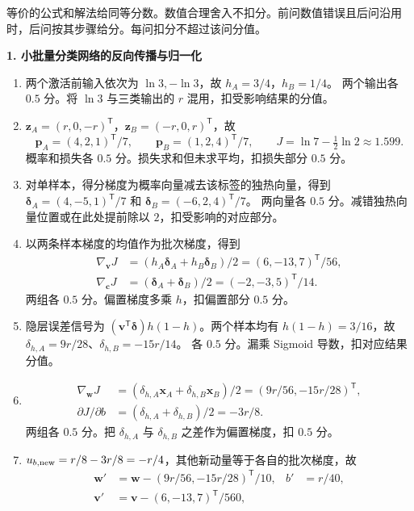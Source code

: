 
\noindent 等价的公式和解法给同等分数。数值合理舍入不扣分。前问数值错误且后问沿用时，后问按其步骤给分。每问扣分不超过该问分值。

\noindent\textbf{1. 小批量分类网络的反向传播与归一化}

\begin{enumerate}[label=(\arabic*)]
\item 两个激活前输入依次为 $\ln 3,-\ln 3$，故 $h_A=3/4$，$h_B=1/4$。
两个输出各 $0.5$ 分。将 $\ln 3$ 与三类输出的 $r$ 混用，扣受影响结果的分值。
\item $\bm{z}_A=(r,0,-r)^{\mathsf T}$，$\bm{z}_B=(-r,0,r)^{\mathsf T}$，故
\[
\bm{p}_A=(4,2,1)^{\mathsf T}/7,\qquad \bm{p}_B=(1,2,4)^{\mathsf T}/7,
\qquad J=\ln 7-\tfrac12\ln 2\approx1.599.
\]
概率和损失各 $0.5$ 分。损失求和但未求平均，扣损失部分 $0.5$ 分。
\item 对单样本，得分梯度为概率向量减去该标签的独热向量，得到
$\bm{\delta}_A=(4,-5,1)^{\mathsf T}/7$ 和 $\bm{\delta}_B=(-6,2,4)^{\mathsf T}/7$。
两向量各 $0.5$ 分。减错独热向量位置或在此处提前除以 $2$，扣受影响的对应部分。
\item 以两条样本梯度的均值作为批次梯度，得到
\begin{align*}
\nabla_{\bm{v}}J&=(h_A\bm{\delta}_A+h_B\bm{\delta}_B)/2
=(6,-13,7)^{\mathsf T}/56,\\
\nabla_{\bm{c}}J&=(\bm{\delta}_A+\bm{\delta}_B)/2=(-2,-3,5)^{\mathsf T}/14.
\end{align*}
两组各 $0.5$ 分。偏置梯度多乘 $h$，扣偏置部分 $0.5$ 分。
\item 隐层误差信号为 $(\bm{v}^{\mathsf T}\bm{\delta})h(1-h)$。两个样本均有 $h(1-h)=3/16$，故 $\delta_{h,A}=9r/28$、$\delta_{h,B}=-15r/14$。
各 $0.5$ 分。漏乘 Sigmoid 导数，扣对应结果分值。
\item
\begin{align*}
\nabla_{\bm{w}}J&=(\delta_{h,A}\bm{x}_A+\delta_{h,B}\bm{x}_B)/2
=(9r/56,-15r/28)^{\mathsf T},\\
\partial J/\partial b&=(\delta_{h,A}+\delta_{h,B})/2=-3r/8.
\end{align*}
两组各 $0.5$ 分。把 $\delta_{h,A}$ 与 $\delta_{h,B}$ 之差作为偏置梯度，扣 $0.5$ 分。
\item $u_{b,\rm new}=r/8-3r/8=-r/4$，其他新动量等于各自的批次梯度，故
\begin{align*}
\bm{w}'&=\bm{w}-(9r/56,-15r/28)^{\mathsf T}/10,& b'&=r/40,\\
\bm{v}'&=\bm{v}-(6,-13,7)^{\mathsf T}/560,&

\end{align*}
\end{enumerate}
